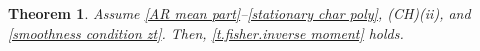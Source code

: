 \documentclass[ejsv2]{imsart}
\theoremstyle{plain}
\newtheorem{theorem}{Theorem}[section]
\theoremstyle{definition}
\theoremstyle{remark}
\begin{document}

\begin{theorem}\label{t SV negative bound}
Assume \eqref{AR mean part}--\eqref{stationary char poly}, {\rm (CH)(ii)}, and
\eqref{smoothness condition zt}. Then, \eqref{t.fisher.inverse moment} holds.
\end{theorem}
\end{document}
